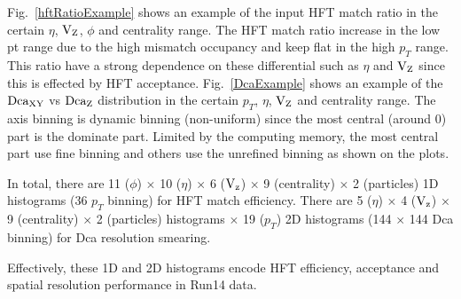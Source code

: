 \documentclass[a4paper]{article}
\begin{document}
Fig.~\ref{hftRatioExample} shows an example of the input HFT match ratio in the certain $\eta$, $\textup{V}_\textup{Z}$, $\phi$ and centrality range. The HFT match ratio increase in the low pt range due to the high mismatch occupancy and keep flat in the high $p_T$ range. This ratio have a strong dependence on these differential such as $\eta$ and $\textup{V}_\textup{Z}$ since this is effected by HFT acceptance. Fig.~\ref{DcaExample} shows an example of the $\textup{Dca}_{\textup{XY}}$ vs $\textup{Dca}_{\textup{Z}}$ distribution in the certain $p_T$, $\eta$, $\textup{V}_\textup{Z}$ and centrality range. The axis binning is dynamic binning (non-uniform) since the most central (around 0) part is the dominate part. Limited by the computing memory, the most central part use fine binning and others use the unrefined binning as shown on the plots.

In total, there are 11 ($\phi$) $\times$ 10 ($\eta$) $\times$ 6 ($\textup{V}_\textup{z}$) $\times$ 9 (centrality) $\times$ 2 (particles) 1D histograms (36 $p_T$ binning) for HFT match efficiency.
There are 5 ($\eta$) $\times$ 4 ($\textup{V}_\textup{z}$) $\times$ 9 (centrality) $\times$ 2 (particles) histograms $\times$ 19 ($p_T$) 2D histograms (144 $\times$ 144 Dca binning) for Dca resolution smearing.

Effectively, these 1D and 2D histograms encode HFT efficiency, acceptance and spatial resolution performance in Run14 data.
\end{document}
